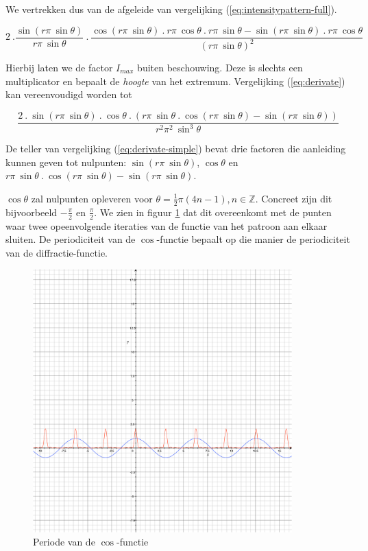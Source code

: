 \documentclass[12pt,a4paper]{article}
\begin{document}
We vertrekken dus van de afgeleide van vergelijking (\ref{eq:intensitypattern-full}). 

\begin{equation} \label{eq:derivate}
2 \ . \frac{\sin( r \pi \ \sin \theta)}{r \pi \ \sin \theta} \ . \ \frac{\cos(r \pi \ \sin \theta)\ . \ r \pi \ \cos \theta \ . \ r \pi \ \sin \theta - \sin(r \pi \ \sin \theta) \ . \ r \pi \ \cos \theta}{(r \pi \ \sin \theta)^2}
\end{equation}

Hierbij laten we de factor $I_{max}$ buiten beschouwing. Deze is slechts een multiplicator en bepaalt de \emph{hoogte} van het extremum. Vergelijking (\ref{eq:derivate}) kan vereenvoudigd worden tot

\begin{equation} \label{eq:derivate-simple}
\frac{2 \ . \ \sin( r \pi \ \sin \theta) \ . \ \cos \theta \ . \ ( r \pi \ \sin \theta \ . \ \cos( r \pi \ \sin \theta) - \sin( r \pi \ \sin \theta))}{r^2 \pi^2 \ \sin^3 \theta}
\end{equation}

De teller van vergelijking (\ref{eq:derivate-simple}) bevat drie factoren die aanleiding kunnen geven tot nulpunten: $\sin( r \pi \ \sin \theta)$, $\cos\theta$ en $r \pi \ \sin \theta \ . \ \cos( r \pi \ \sin \theta) - \sin( r \pi \ \sin \theta)$.

$\cos\theta$ zal nulpunten opleveren voor $\theta = \frac{1}{2} \pi (4n-1), n \in \mathbb{Z}$. Concreet zijn dit bijvoorbeeld $-\frac{\pi}{2}$ en $\frac{\pi}{2}$. We zien in figuur \ref{fig:cosine-period} dat dit overeenkomt met de punten waar twee opeenvolgende iteraties van de functie van het patroon aan elkaar sluiten. De periodiciteit van de $\cos$-functie bepaalt op die manier de periodiciteit van de diffractie-functie.

\begin{figure}
\begin{center}
 \includegraphics[width=100mm]{resources/cosine-period.pdf}
 \caption{Periode van de $\cos$-functie}
  \label{fig:cosine-period}
\end{center}
\end{figure}
\end{document}
